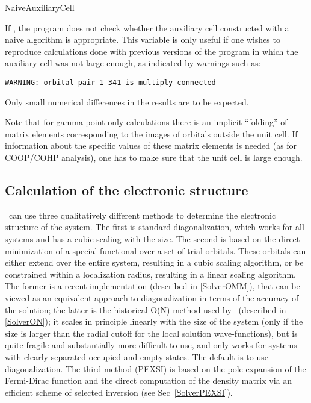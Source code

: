 \begin{fdflogicalF}{NaiveAuxiliaryCell}
  
  If \fdftrue, the program does not check whether the auxiliary cell
  constructed with a naive algorithm is appropriate. This variable is
  only useful if one wishes to reproduce calculations done with
  previous versions of the program in which the auxiliary cell was not
  large enough, as indicated by warnings such as:

  \texttt{WARNING: orbital pair 1 341 is multiply connected}

  Only small numerical differences in the results are to be expected.
  
  Note that for gamma-point-only calculations there is an implicit
  ``folding'' of matrix elements corresponding to the images of orbitals
  outside the unit cell. If information about the specific values of
  these matrix elements is needed (as for COOP/COHP analysis), one has
  to make sure that the unit cell is large enough.  

\end{fdflogicalF}


\subsection{Calculation of the electronic structure}

\siesta\ can use three qualitatively different methods to determine
the electronic structure of the system. The first is standard
diagonalization, which works for all systems and has a cubic scaling
with the size. The second is based on
the direct minimization of a special functional over a set of
trial orbitals. These orbitals can either extend over the entire system,
resulting in a cubic scaling algorithm, or be constrained within a
localization radius, resulting in a linear scaling algorithm. The former
is a recent implementation (described in \ref{SolverOMM}), that can
be viewed as an equivalent approach to diagonalization in terms of the
accuracy of the solution; the latter is the historical O(N) method used by
\siesta\ (described in \ref{SolverON}); it scales in principle
linearly with the size of the system (only if the size is larger than
the radial cutoff for the local solution wave-functions), but is quite
fragile and substantially more difficult to use, and only works for
systems with clearly separated occupied and empty states. The default is
to use diagonalization. The third method (PEXSI) is based on the
pole expansion of the Fermi-Dirac function and the direct computation
of the density matrix via an efficient scheme of selected
inversion (see Sec~\ref{SolverPEXSI}).

